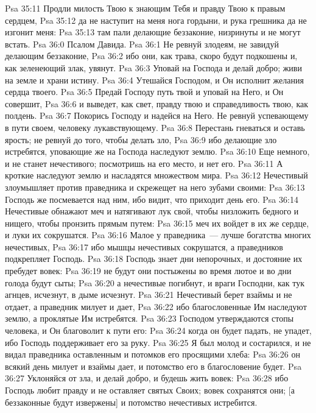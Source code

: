 \vs Psa 35:11 Продли милость Твою к знающим Тебя и правду Твою к правым сердцем,
\vs Psa 35:12 да не наступит на меня нога гордыни, и рука грешника да не изгонит меня:
\vs Psa 35:13 там пали делающие беззаконие, низринуты и не могут встать.
\vs Psa 36:0 Псалом Давида.
\rsbpar\vs Psa 36:1 Не ревнуй злодеям, не завидуй делающим беззаконие,
\vs Psa 36:2 ибо они, как трава, скоро будут подкошены и, как зеленеющий злак, увянут.
\vs Psa 36:3 Уповай на Господа и делай добро; живи на земле и храни истину.
\vs Psa 36:4 Утешайся Господом, и Он исполнит желания сердца твоего.
\vs Psa 36:5 Предай Господу путь твой и уповай на Него, и Он совершит,
\vs Psa 36:6 и выведет, как свет, правду твою и справедливость твою, как полдень.
\vs Psa 36:7 Покорись Господу и надейся на Него. Не ревнуй успевающему в пути своем, человеку лукавствующему.
\vs Psa 36:8 Перестань гневаться и оставь ярость; не ревнуй до того, чтобы делать зло,
\vs Psa 36:9 ибо делающие зло истребятся, уповающие же на Господа наследуют землю.
\vs Psa 36:10 Еще немного, и не станет нечестивого; посмотришь на его место, и нет его.
\vs Psa 36:11 А кроткие наследуют землю и насладятся множеством мира.
\vs Psa 36:12 Нечестивый злоумышляет против праведника и скрежещет на него зубами своими:
\vs Psa 36:13 Господь же посмевается над ним, ибо видит, что приходит день его.
\vs Psa 36:14 Нечестивые обнажают меч и натягивают лук свой, чтобы низложить бедного и нищего, чтобы пронзить  прямым путем:
\vs Psa 36:15 меч их войдет в их же сердце, и луки их сокрушатся.
\vs Psa 36:16 Малое у праведника~--- лучше богатства многих нечестивых,
\vs Psa 36:17 ибо мышцы нечестивых сокрушатся, а праведников подкрепляет Господь.
\vs Psa 36:18 Господь знает дни непорочных, и достояние их пребудет вовек:
\vs Psa 36:19 не будут они постыжены во время лютое и во дни голода будут сыты;
\vs Psa 36:20 а нечестивые погибнут, и враги Господни, как тук агнцев, исчезнут, в дыме исчезнут.
\vs Psa 36:21 Нечестивый берет взаймы и не отдает, а праведник милует и дает,
\vs Psa 36:22 ибо благословенные Им наследуют землю, а проклятые Им истребятся.
\vs Psa 36:23 Господом утверждаются стопы  человека, и Он благоволит к пути его:
\vs Psa 36:24 когда он будет падать, не упадет, ибо Господь поддерживает его за руку.
\vs Psa 36:25 Я был молод и состарился, и не видал праведника оставленным и потомков его просящими хлеба:
\vs Psa 36:26 он всякий день милует и взаймы дает, и потомство его в благословение будет.
\vs Psa 36:27 Уклоняйся от зла, и делай добро, и будешь жить вовек:
\vs Psa 36:28 ибо Господь любит правду и не оставляет святых Своих; вовек сохранятся они; [а беззаконные будут извержены] и потомство нечестивых истребится.
